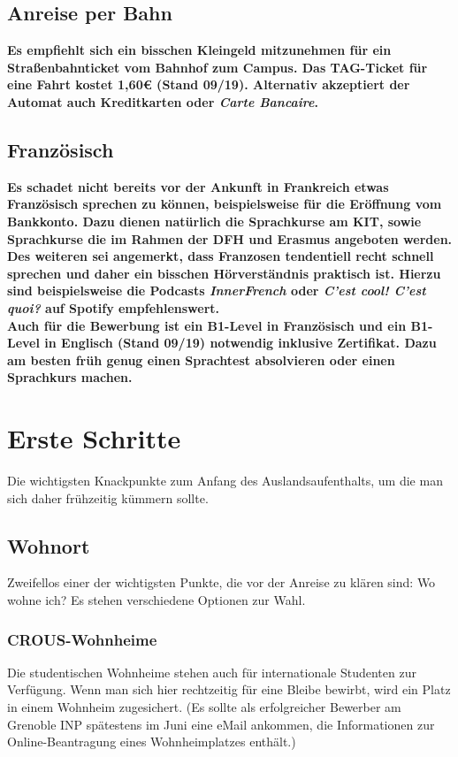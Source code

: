 \documentclass[11pt,a4paper]{article}
\newcommand{\change}[1]{{\bf #1}}
\begin{document}
  \subsection{Anreise per Bahn}
  \change{Es empfiehlt sich ein bisschen Kleingeld mitzunehmen für ein Straßenbahnticket vom Bahnhof zum Campus. Das TAG-Ticket für eine Fahrt kostet 1,60€ (Stand 09/19). Alternativ akzeptiert der Automat auch Kreditkarten oder \textit{Carte Bancaire}.}

  \subsection{Französisch}
  \change{Es schadet nicht bereits vor der Ankunft in Frankreich etwas Französisch sprechen zu können, beispielsweise für die Eröffnung vom Bankkonto. Dazu dienen natürlich die Sprachkurse am KIT, sowie Sprachkurse die im Rahmen der DFH und Erasmus angeboten werden. Des weiteren sei angemerkt, dass Franzosen tendentiell recht schnell sprechen und daher ein bisschen Hörverständnis praktisch ist. Hierzu sind beispielsweise die Podcasts \textit{InnerFrench} oder \textit{C'est cool! C'est quoi?} auf Spotify empfehlenswert.\\
  Auch für die Bewerbung ist ein B1-Level in Französisch und ein B1-Level in Englisch (Stand 09/19) notwendig inklusive Zertifikat. Dazu am besten früh genug einen Sprachtest absolvieren oder einen Sprachkurs machen.}
		
	\newpage
	\section{Erste Schritte}
	
	Die wichtigsten Knackpunkte zum Anfang des Auslandsaufenthalts, um die man sich daher frühzeitig kümmern sollte.
	
	\subsection{Wohnort}
	
	Zweifellos einer der wichtigsten Punkte, die vor der Anreise zu klären sind: Wo wohne ich? Es stehen verschiedene Optionen zur Wahl.
	
	\subsubsection{CROUS-Wohnheime}
	
	Die studentischen Wohnheime stehen auch für internationale Studenten zur Verfügung. Wenn man sich hier rechtzeitig für eine Bleibe bewirbt, wird ein Platz in einem Wohnheim zugesichert. (Es sollte als erfolgreicher Bewerber am Grenoble INP spätestens im Juni eine eMail ankommen, die Informationen zur Online-Beantragung eines Wohnheimplatzes enthält.)
	
\end{document}
